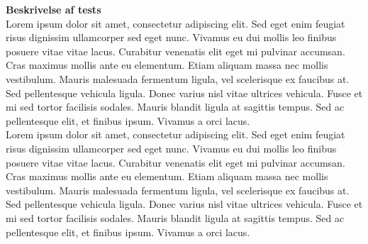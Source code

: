 \textbf{Beskrivelse af tests}\\
Lorem ipsum dolor sit amet, consectetur adipiscing elit. Sed eget enim feugiat risus dignissim ullamcorper sed eget nunc. Vivamus eu dui mollis leo finibus posuere vitae vitae lacus. Curabitur venenatis elit eget mi pulvinar accumsan. Cras maximus mollis ante eu elementum. Etiam aliquam massa nec mollis vestibulum. Mauris malesuada fermentum ligula, vel scelerisque ex faucibus at. Sed pellentesque vehicula ligula. Donec varius nisl vitae ultrices vehicula. Fusce et mi sed tortor facilisis sodales. Mauris blandit ligula at sagittis tempus. Sed ac pellentesque elit, et finibus ipsum. Vivamus a orci lacus. \\
Lorem ipsum dolor sit amet, consectetur adipiscing elit. Sed eget enim feugiat risus dignissim ullamcorper sed eget nunc. Vivamus eu dui mollis leo finibus posuere vitae vitae lacus. Curabitur venenatis elit eget mi pulvinar accumsan. Cras maximus mollis ante eu elementum. Etiam aliquam massa nec mollis vestibulum. Mauris malesuada fermentum ligula, vel scelerisque ex faucibus at. Sed pellentesque vehicula ligula. Donec varius nisl vitae ultrices vehicula. Fusce et mi sed tortor facilisis sodales. Mauris blandit ligula at sagittis tempus. Sed ac pellentesque elit, et finibus ipsum. Vivamus a orci lacus. 